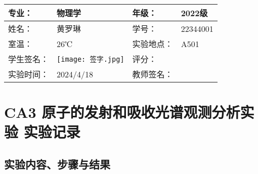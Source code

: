 \documentclass[dvipsnames, svgnames,a4paper,11pt]{article}
\begin{document}
	
	\clearpage
	
	\begin{table}
		\renewcommand\arraystretch{1.7}
		\centering
		\begin{tabularx}{\textwidth}{|X|X|X|X|}
			\hline
			专业： & 物理学 & 年级： & 2022级 \\
			\hline
			姓名： &  黄罗琳& 学号： & 22344001\\
			\hline
			室温： &26℃  & 实验地点： & A501 \\
			\hline
			学生签名：&  \texttt{[image: 签字.jpg]} & 评分： &\\
			\hline
			实验时间：& 2024/4/18 & 教师签名：&\\
			\hline
		\end{tabularx}
	\end{table}
	
	\section{CA3 \quad 原子的发射和吸收光谱观测分析实验 \quad\heiti 实验记录}
	
	\subsection{实验内容、步骤与结果}
	
\end{document}
